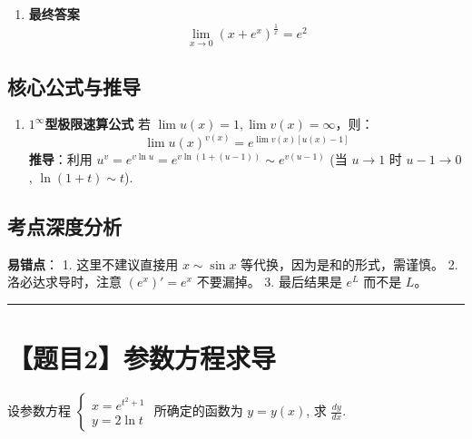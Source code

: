 \documentclass[12pt, a4paper]{article}
\newenvironment{redenv}{\color{red}}{}
\newenvironment{detailedanalysis}{%
    \color{red}
    \begin{enumerate}[label=\textbf{第\arabic*步：}, leftmargin=*, align=left, itemsep=1.5ex]
}{%
    \end{enumerate}
}
\newenvironment{conceptbox}{%
    \begin{tcolorbox}[colback=red!5, colframe=red!50!black, title=概念解析, fonttitle=\bfseries]
}{%
    \end{tcolorbox}
}
\newenvironment{formuladerivation}{%
    \begin{enumerate}[label={\textbf{公式\arabic*：}}, leftmargin=*, align=left]
}{%
    \end{enumerate}
}
\newcommand{\problemrule}{\noindent\rule{\textwidth}{1.5pt}\vspace{-0.8em}}
\begin{document}
\begin{redenv}
\begin{detailedanalysis}
\item \textbf{最终答案}
\[ \lim\limits_{x \to 0} (x + e^x)^{\frac{1}{x}} = e^2 \]
\end{detailedanalysis}

\subsection*{核心公式与推导}
\begin{formuladerivation}
\item \textbf{$1^\infty$型极限速算公式}
若 $\lim u(x) = 1, \lim v(x) = \infty$，则：
\[ \lim u(x)^{v(x)} = e^{\lim v(x)[u(x)-1]} \]
\textbf{推导}：利用 $u^v = e^{v \ln u} = e^{v \ln(1+(u-1))} \sim e^{v(u-1)}$ (当 $u \to 1$ 时 $u-1 \to 0$, $\ln(1+t) \sim t$).
\end{formuladerivation}

\subsection*{考点深度分析}
\begin{conceptbox}
\textbf{易错点}：
1. 这里不建议直接用 $x \sim \sin x$ 等代换，因为是和的形式，需谨慎。
2. 洛必达求导时，注意 $(e^x)' = e^x$ 不要漏掉。
3. 最后结果是 $e^L$ 而不是 $L$。
\end{conceptbox}
\end{redenv}


\problemrule
\section*{【题目2】参数方程求导}
设参数方程 $\begin{cases} x = e^{t^2+1} \\ y = 2\ln t \end{cases}$ 所确定的函数为 $y=y(x)$, 求 $\frac{dy}{dx}$.
\end{document}

